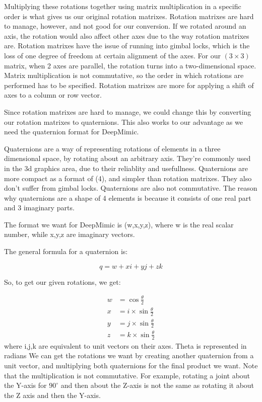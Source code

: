\documentclass{l4proj}
\begin{document}
Multiplying these rotations together using matrix multiplication in a specific order is what gives us our original rotation matrixes. Rotation matrixes are hard to manage, however, and not good for our conversion. If we rotated around an axis, the rotation would also affect other axes due to the way rotation matrixes are. Rotation matrixes have the issue of running into gimbal locks, which is the loss of one degree of freedom at certain alignment of the axes. For our $(3\times3)$ matrix, when 2 axes are parallel, the rotation turns into a two-dimensional space. Matrix multiplication is not commutative, so the order in which rotations are performed has to be specified. Rotation matrixes are more for applying a shift of axes to a column or row vector. 

Since rotation matrixes are hard to manage, we could change this by converting our rotation matrixes to quaternions. This also works to our advantage as we need the quaternion format for DeepMimic.

Quaternions are a way of representing rotations of elements in a three dimensional space, by rotating about an arbitrary axis. They're commonly used in the 3d graphics area, due to their reliablity and usefullness. Quaternions are more compact as a format of (4), and simpler than rotation matrixes. They also don't suffer from gimbal locks. Quaternions are also not commutative. The reason why quaternions are a shape of 4 elements is because it consists of one real part and 3 imaginary parts.

The format we want for DeepMimic is (w,x,y,z), where w is the real scalar number, while x,y,z are imaginary vectors.

The general formula for a quaternion is:

\begin{equation}
  q = w + xi + yj +zk
\end{equation}

So, to get our given rotations, we get:

\begin{equation}
  \begin{aligned}
    w &= \cos\frac{\theta}{2}\\
    x &= i\times\sin\frac{\theta}{2}\\
    y &= j\times\sin\frac{\theta}{2}\\
    z &= k\times\sin\frac{\theta}{2}
  \end{aligned}
\end{equation}
where i,j,k are equivalent to unit vectors on their axes. Theta is represented in radians We can get the rotations we want by creating another quaternion from a unit vector, and multiplying both quaternions for the final product we want. Note that the multiplication is not commutative. For example, rotating a joint about the Y-axis for $90^{\circ}$ and then about the Z-axis is not the same as rotating it about the Z axis and then the Y-axis.
\end{document}
